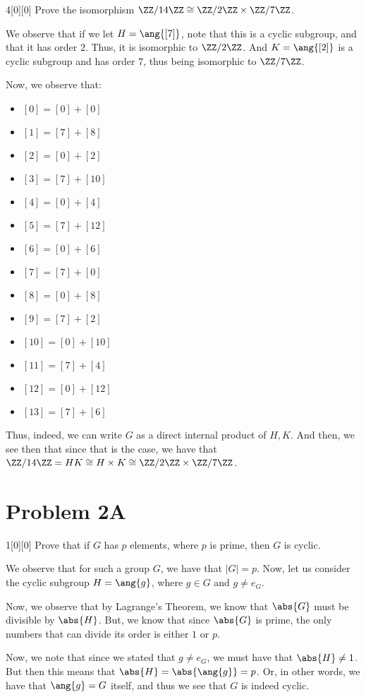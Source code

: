 \documentclass{article}
\begin{document}
\begin{hw}{4}[0][0]
	Prove the isomorphism $\ZZ/14\ZZ \cong \ZZ/2\ZZ \times \ZZ/7\ZZ$.
\end{hw}
\begin{solution}
	We observe that if we let $H = \ang{[7]}$, note that this is a cyclic subgroup, and that it has order $2$. Thus, it is isomorphic to $\ZZ/2\ZZ$. And $K = \ang{[2]}$ is a cyclic subgroup and has order $7$, thus being isomorphic to $\ZZ/7\ZZ$.
	
	Now, we observe that:
	\begin{itemize}
		\item $[0] = [0] + [0]$
		\item $[1] = [7] + [8]$
		\item $[2] = [0] + [2]$
		\item $[3] = [7] + [10]$
		\item $[4] = [0] + [4]$
		\item $[5] = [7] + [12]$
		\item $[6] = [0] + [6]$
		\item $[7] = [7] + [0]$
		\item $[8] = [0] + [8]$
		\item $[9] = [7] + [2]$
		\item $[10] = [0] + [10]$
		\item $[11] = [7] + [4]$
		\item $[12] = [0] + [12]$
		\item $[13] = [7] + [6]$
	\end{itemize}

	Thus, indeed, we can write $G$ as a direct internal product of $H, K$. And then, we see then that since that is the case, we have that $\ZZ/14\ZZ = HK \cong H \times K \cong \ZZ/2\ZZ \times \ZZ/7\ZZ$.
\end{solution}

\section{Problem 2A}
\begin{hw}{1}[0][0]
	Prove that if $G$ has $p$ elements, where $p$ is prime, then $G$ is cyclic.
\end{hw}
\begin{solution}
	We observe that for such a group $G$, we have that $\lvert G \rvert = p$. Now, let us consider the cyclic subgroup $H = \ang{g}$, where $g \in G$ and $g \neq e_G$.
	
	Now, we observe that by Lagrange's Theorem, we know that $\abs{G}$ must be divisible by $\abs{H}$. But, we know that since $\abs{G}$ is prime, the only numbers that can divide its order is either $1$ or $p$.
	
	Now, we note that since we stated that $g \neq e_G$, we must have that $\abs{H} \neq 1$. But then this means that $\abs{H} = \abs{\ang{g}} = p$. Or, in other words, we have that $\ang{g} = G$ itself, and thus we see that $G$ is indeed cyclic.
\end{solution}
\end{document}

